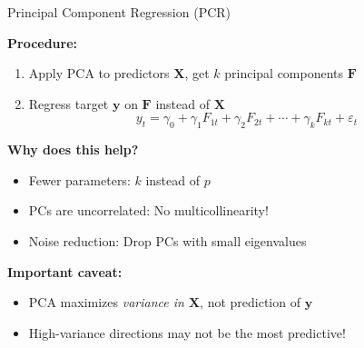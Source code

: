 \documentclass[10pt]{beamer}
\begin{document}
\begin{frame}{Principal Component Regression (PCR)}

  \textbf{Procedure:}
  \begin{enumerate}
    \item Apply PCA to predictors $\mathbf{X}$, get $k$ principal components $\mathbf{F}$
    \item Regress target $\mathbf{y}$ on $\mathbf{F}$ instead of $\mathbf{X}$
    \[
    y_t = \gamma_0 + \gamma_1 F_{1t} + \gamma_2 F_{2t} + \cdots + \gamma_k F_{kt} + \varepsilon_t
    \]
  \end{enumerate}

  \vspace{1em}
  \textbf{Why does this help?}
  \begin{itemize}
    \item Fewer parameters: $k$ instead of $p$
    \item PCs are uncorrelated: No multicollinearity!
    \item Noise reduction: Drop PCs with small eigenvalues
  \end{itemize}

  \vspace{0.5em}
  \textbf{Important caveat:}
  \begin{itemize}
    \item PCA maximizes \emph{variance in $\mathbf{X}$}, not prediction of $\mathbf{y}$
    \item High-variance directions may not be the most predictive!
  \end{itemize}
\end{frame}

\end{document}
